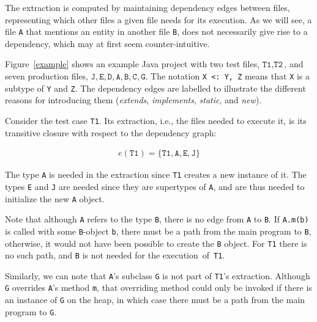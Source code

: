 {%

The extraction is computed by maintaining dependency edges between files, representing which other files a given file needs for its execution. As we will see, a file \texttt{A} that mentions an entity in another file \texttt{B}, does not necessarily give rise to a dependency, which may at first seem counter-intuitive.   

Figure~\ref{example} shows an example Java project with two test files, $\texttt{T1}, \texttt{T2}$,
and seven production files, $\texttt{J}, \texttt{E}, \texttt{D}, \texttt{A}, \texttt{B}, \texttt{C}, \texttt{G}$. The notation \verb!X <: Y, Z! means that \texttt{X} is a subtype of \texttt{Y} and \texttt{Z}. The dependency edges are labelled to illustrate the different reasons for introducing them (\emph{extends}, \emph{implements}, \emph{static}, and \emph{new}).
 
Consider the test case \texttt{T1}. Its extraction, i.e., the files needed to execute it, is its transitive closure with respect to the dependency graph:

\begin{eqnarray}
e(\texttt{T1}) = \{\texttt{T1}, \texttt{A}, \texttt{E}, \texttt{J}\} \nonumber
\end{eqnarray}

The type \texttt{A} is needed in the extraction since \texttt{T1} creates a new instance of it. The types \texttt{E} and \texttt{J} are needed since they are supertypes of \texttt{A}, and are thus needed to initialize the new \texttt{A} object.

Note that although \texttt{A} refers to the type \texttt{B}, there is no edge from \texttt{A} to
\texttt{B}. If \texttt{A.m(b)} is called with some \texttt{B}-object \texttt{b}, there must be a
path from the main program to \texttt{B}, otherwise, it would not have been possible to create the
\texttt{B} object. For \texttt{T1} there is no such path, and \texttt{B} is not needed for the
execution~of~\texttt{T1}.

Similarly, we can note that \texttt{A}'s subclass \texttt{G} is not part of \texttt{T1}'s extraction. Although \texttt{G} overrides \texttt{A}'s method \texttt{m}, that overriding method could only be invoked if there is an instance of \texttt{G} on the heap, in which case there must be a path from the main program to \texttt{G}.

}
